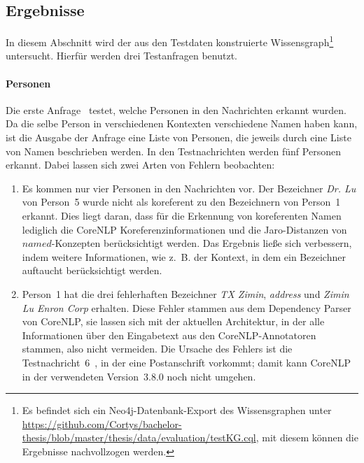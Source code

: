 \subsection{Ergebnisse}%
\label{sec:evaluation:quality:results}

In diesem Abschnitt wird der aus den Testdaten konstruierte Wissensgraph\footnote{Es befindet sich ein Neo4j-Datenbank-Export des Wissensgraphen unter \url{https://github.com/Cortys/bachelor-thesis/blob/master/thesis/data/evaluation/testKG.cql}, mit diesem können die Ergebnisse nachvollzogen werden.} untersucht.
Hierfür werden drei Testanfragen benutzt.

\paragraph{Personen}
Die erste Anfrage~ testet, welche Personen in den Nachrichten erkannt wurden.
Da die selbe Person in verschiedenen Kontexten verschiedene Namen haben kann, ist die Ausgabe der Anfrage eine Liste von Personen, die jeweils durch eine Liste von Namen beschrieben werden.
In den Testnachrichten werden fünf Personen erkannt.
Dabei lassen sich zwei Arten von Fehlern beobachten:
\begin{enumerate}
	\item Es kommen nur vier Personen in den Nachrichten vor.
		Der Bezeichner \textit{Dr. Lu} von Person~5 wurde nicht als koreferent zu den Bezeichnern von Person~1 erkannt. %
		Dies liegt daran, dass für die Erkennung von koreferenten Namen lediglich die CoreNLP Koreferenzinformationen und die Jaro-Distanzen von $named$-Konzepten berücksichtigt werden.
		Das Ergebnis ließe sich verbessern, indem weitere Informationen, wie z.~B. der Kontext, in dem ein Bezeichner auftaucht berücksichtigt werden.
	\item Person~1 hat die drei fehlerhaften Bezeichner \textit{TX Zimin}, \textit{address} und \textit{Zimin Lu Enron Corp} erhalten.
		Diese Fehler stammen aus dem Dependency Parser von CoreNLP, sie lassen sich mit der aktuellen Architektur, in der alle Informationen über den Eingabetext aus den CoreNLP-Annotatoren stammen, also nicht vermeiden.
		Die Ursache des Fehlers ist die Testnachricht~6~, in der eine Postanschrift vorkommt;
		damit kann CoreNLP in der verwendeten Version~3.8.0 noch nicht umgehen.
\end{enumerate}

